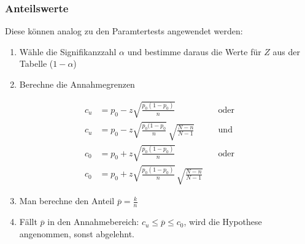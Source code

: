 \subsubsection{Anteilswerte}
Diese können analog zu den Paramtertests angewendet werden:
\begin{enumerate}
\item Wähle die Signifikanzzahl $\alpha$ und bestimme daraus die Werte für $Z$ aus der Tabelle ($1-\alpha$)
\item Berechne die Annahmegrenzen 
\end{enumerate}
\begin{align}
c_u &= p_0 - z\displaystyle\sqrt{\frac{p_0(1-p_0)}{n}}&\quad\mbox{oder} \\
c_u &= p_0 - z\displaystyle\sqrt{\frac{p_0(1-p_0}{n}}\,\sqrt{\frac{N-n}{N-1}}&\quad\mbox{und} \\
c_0&=p_0 + z\displaystyle\sqrt{\frac{p_0(1-p_0)}{n}}&\quad\mbox{oder} \\
c_0&= p_0 + z \displaystyle\sqrt{\frac{p_0(1-p_0)}{n}}\,\sqrt{\frac{N-n}{N-1}}&
\end{align}
\begin{enumerate}
  \setcounter{enumi}{2}
  \item Man berechne den Anteil $\overline{p}=\frac{k}{n}$
  \item Fällt $\overline{p}$ in den Annahmebereich: $c_u\leq\overline{p}\leq c_0$, wird die Hypothese angenommen, sonst abgelehnt.
\end{enumerate}
